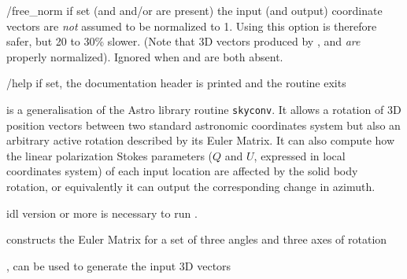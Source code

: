 \begin{keywords}
  \begin{kwlist}{} %
%
     \item[/free\_norm] if set 
         (and  and/or 
          are present)
        the input (and output) coordinate vectors are \emph{not} assumed to be normalized to 1.
        Using this option is therefore safer, but 20 to 30\% slower.
        (Note that 3D vectors produced by 
        , 
	 and 
         \emph{are} properly normalized).
        Ignored when  and
          are both absent.
%
    \item[/help] 
     if set, the documentation header is printed and the routine exits
%	
  \end{kwlist}
\end{keywords}  

\begin{codedescription}
{\thedocid{} is a generalisation of the Astro library routine {\tt skyconv}. It allows
a rotation of 3D position vectors between two standard astronomic coordinates
system but also an arbitrary active rotation described by its Euler Matrix.
It can also compute how the linear polarization Stokes parameters ($Q$ and $U$, 
expressed in local coordinates system)
of each input location are affected by the solid body rotation, or equivalently
it can output the corresponding change in azimuth.}
\end{codedescription}



\begin{related}
  \begin{sulist}{} %
    \item[idl] version \idlversion or more is necessary to run \thedocid.
    \item[\htmlref{euler\_matrix\_new}{idl:euler_matrix_new}] constructs the Euler Matrix for a set of
    three angles and three axes of rotation
    \item[\htmlref{\texttt{ang2vec}}{idl:ang2vec}, \htmlref{\texttt{pix2vec\_*}}{idl:pix_tools}] can be used to generate the input 3D vectors
  \end{sulist}
\end{related}


